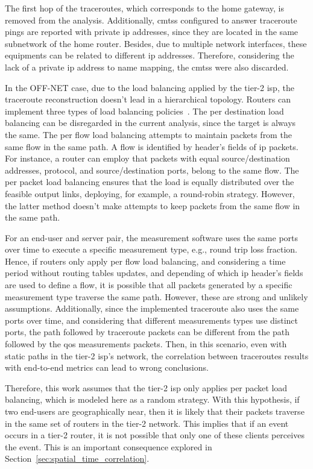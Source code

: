 The first hop of the traceroutes, which corresponds to the home gateway, is
removed from the analysis.
Additionally, \glspl*{cmts} configured to answer traceroute pings are reported
with private \gls*{ip} addresses,
since they are located in the same subnetwork of the home router.
Besides, due to multiple network interfaces, these equipments can be related
to different \gls*{ip} addresses.
Therefore, considering the lack of a private \gls*{ip} address to name mapping,
the \glspl*{cmts} were also discarded.

In the OFF-NET case, due to the load balancing applied by the tier-2 \gls*{isp},
the traceroute reconstruction doesn't lead in a hierarchical topology.
Routers can implement three types of load balancing
policies~\cite{avoiding_traceroute_anomalies_with_paris_traceroute}.
The per
destination load balancing can be disregarded in the current analysis, since
the target is always the same. The per flow load balancing attempts to
maintain packets from the same flow in the same path. A flow is identified
by header's fields of \gls*{ip} packets. For instance, a
router can employ that packets with equal source/destination
addresses, protocol, and source/destination ports,
belong to the same flow. The per packet load
balancing ensures that the load is equally distributed over the feasible output
links, deploying, for example, a round-robin strategy. However, the latter
method doesn't
make attempts to keep packets from the same flow in the same path.

For an end-user and server pair,
the measurement software uses the same ports over time to execute a specific
measurement type, e.g., round trip loss fraction.
Hence, if routers only apply per flow load balancing,
and considering a time period without routing tables updates, and
depending of which \gls*{ip} header's fields are used to define a flow, it is possible
that all packets generated by a specific measurement type traverse the same
path. However, these are strong and unlikely assumptions.
Additionally, since the implemented traceroute also uses the same ports over
time, and considering that different measurements types use distinct ports,
the
path followed by traceroute packets can be different from the path followed by
the \gls*{qos} measurements packets. Then, in this scenario, even with static paths in
the tier-2 \gls*{isp}'s network, the correlation between traceroutes
results with end-to-end metrics can lead to wrong conclusions.

Therefore, this work assumes that the tier-2 \gls*{isp} only applies per packet load
balancing, which is modeled here as a random strategy. With this hypothesis,
if two end-users are geographically near, then it is likely that their packets
traverse in the same set of routers in the tier-2 network. This implies that if
an event occurs in a tier-2 router, it is not possible that only one of these
clients perceives the event. This is an important consequence explored in
Section~\ref{sec:spatial_time_correlation}.

